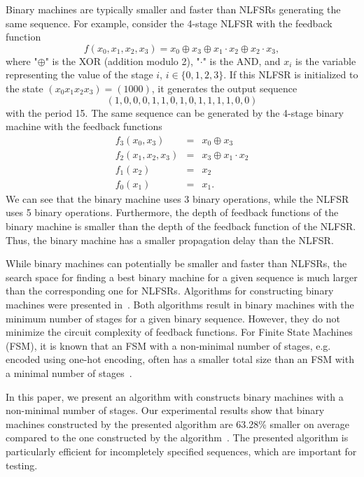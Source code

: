 \documentclass[10pt,conference]{IEEEtran}
\begin{document}
Binary machines are typically smaller and
faster than NLFSRs generating the same sequence. 
For example, consider the 4-stage NLFSR with the feedback function 
\[
f(x_0,x_1,x_2,x_3) = x_0 \oplus x_3 \oplus x_1 \cdot x_2 \oplus x_2 \cdot x_3,
\]
where "$\oplus$" is the XOR (addition modulo 2), "$\cdot$" is the AND,
and $x_i$ is the variable representing the value of the stage $i$, 
$i \in \{0,1,2,3\}$.
If this NLFSR is initialized to the state $(x_0 x_1 x_2 x_3) = (1000)$, it 
generates the output sequence 
\begin{equation} \label{bs}
(1,0,0,0,1,1,0,1,0,1,1,1,1,0,0)
\end{equation}
with the period 15.
The same sequence can be generated by the 4-stage binary machine with the 
feedback functions
\[
\begin{array}{lcl}
f_3(x_0,x_3) & = & x_0 \oplus x_3 \\
f_2(x_1,x_2,x_3) & = & x_3 \oplus x_1 \cdot x_2  \\
f_1(x_2) & = & x_2 \\
f_0(x_1) & = & x_1.
\end{array}
\]
We can see that the binary machine uses 3 binary operations,
while the NLFSR uses 5 binary operations. Furthermore,
the depth of feedback functions of the binary machine is smaller than
the depth of the feedback function of the NLFSR. Thus, the
binary machine has a smaller propagation delay than the NLFSR.

While binary machines can potentially be smaller and faster than NLFSRs, 
the search space for finding a best binary machine for a given sequence
is much larger than the corresponding one for NLFSRs.
Algorithms for constructing binary machines 
were presented in~\cite{Du10aj,Du11a}. Both algorithms
result in binary machines with the minimum number of stages
for a given binary sequence. However, they do not minimize the circuit 
complexity of feedback functions.
For Finite State Machines (FSM), it is known that an FSM 
with a non-minimal number of stages, e.g. encoded
using one-hot encoding, often has a smaller total size
than an FSM with a minimal number of stages~\cite{MiBS85}.

In this paper, we present an algorithm with constructs binary machines
with a non-minimal number of stages.
Our experimental results show that binary machines 
constructed by the presented algorithm are 63.28\% smaller 
on average compared to the one constructed 
by the algorithm~\cite{Du11a}.
The presented algorithm is particularly efficient for incompletely specified sequences,
which are important for testing.
\end{document}
